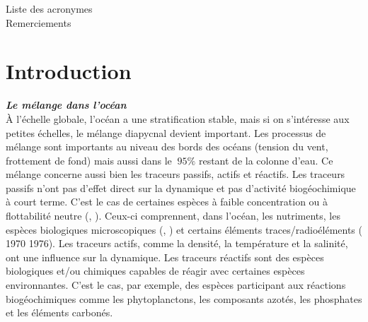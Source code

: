 \documentclass[a4paper,12pt]{article}
\begin{document}
\newpage
Liste des acronymes \\
Remerciements\\

\newpage
\section{Introduction}

    \textbf{\textit{Le mélange dans l'océan}} \\
    À l'échelle globale, l'océan a une stratification stable, mais si on s'intéresse aux petites échelles, le mélange diapycnal devient important. Les processus de mélange sont importants au niveau des bords des océans (tension du vent, frottement de fond) mais aussi dans le $~95\%$ restant de la colonne d'eau. Ce mélange concerne aussi bien les traceurs passifs, actifs et réactifs. Les traceurs passifs n'ont pas d'effet direct sur la dynamique et pas d'activité biogéochimique à court terme. C'est le cas de certaines espèces à faible concentration ou à flottabilité neutre (\cite{warhaft_passive_2000}, \cite{canuto_vertical_2011}). Ceux-ci comprennent, dans l'océan, les nutriments, les espèces biologiques microscopiques (\cite{vaquer-sunyer_thresholds_2008}, \cite{brierley_impacts_2009}) et certains éléments traces/radioéléments (\cite{broecker_distribution_nodate} 1970 1976). Les traceurs actifs, comme la densité, la température et la salinité, ont une influence sur la dynamique. Les traceurs réactifs sont des espèces biologiques et/ou chimiques capables de réagir avec certaines espèces environnantes. C'est le cas, par exemple, des espèces participant aux réactions biogéochimiques comme les phytoplanctons, les composants azotés, les phosphates et les éléments carbonés. 
    \\
\end{document}
